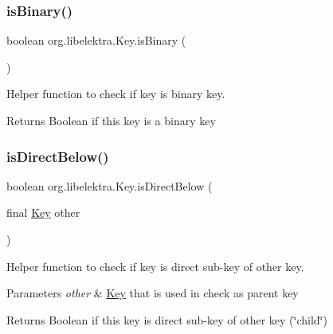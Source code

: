 \subsubsection{\texorpdfstring{is\+Binary()}{isBinary()}}
{\footnotesize\ttfamily boolean org.\+libelektra.\+Key.\+is\+Binary (\begin{DoxyParamCaption}{ }\end{DoxyParamCaption})\hspace{0.3cm}{\ttfamily [inline]}}



Helper function to check if key is binary key. 

\begin{DoxyReturn}{Returns}
Boolean if this key is a binary key 
\end{DoxyReturn}
\mbox{\label{classorg_1_1libelektra_1_1Key_a799b0577d5e1491702e45566c943bda4}} 
\subsubsection{\texorpdfstring{is\+Direct\+Below()}{isDirectBelow()}}
{\footnotesize\ttfamily boolean org.\+libelektra.\+Key.\+is\+Direct\+Below (\begin{DoxyParamCaption}\item[{final \hyperlink{classorg_1_1libelektra_1_1Key}{Key}}]{other }\end{DoxyParamCaption})\hspace{0.3cm}{\ttfamily [inline]}}



Helper function to check if key is direct sub-\/key of other key. 


\begin{DoxyParams}{Parameters}
{\em other} & \hyperlink{classorg_1_1libelektra_1_1Key}{Key} that is used in check as parent key \\
\hline
\end{DoxyParams}
\begin{DoxyReturn}{Returns}
Boolean if this key is direct sub-\/key of other key (\char`\"{}child\char`\"{}) 
\end{DoxyReturn}
\mbox{\label{classorg_1_1libelektra_1_1Key_a1707144b9d6c0c29531e3e372e1ffaee}} 
